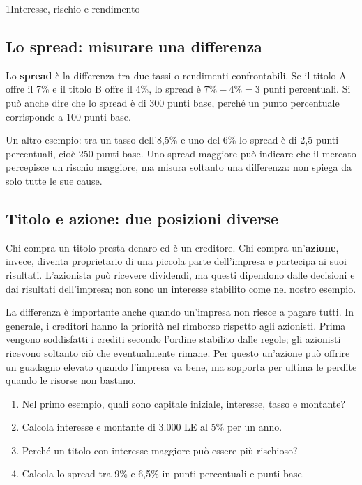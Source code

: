 \begin{lettura}{1}{Interesse, rischio e rendimento}
\subsection*{Lo spread: misurare una differenza}
Lo \textbf{spread} è la differenza tra due tassi o rendimenti confrontabili. Se il titolo A offre il 7\% e il titolo B offre il 4\%, lo spread è $7\%-4\%=3$ punti percentuali. Si può anche dire che lo spread è di 300 punti base, perché un punto percentuale corrisponde a 100 punti base.

Un altro esempio: tra un tasso dell'8,5\% e uno del 6\% lo spread è di 2,5 punti percentuali, cioè 250 punti base. Uno spread maggiore può indicare che il mercato percepisce un rischio maggiore, ma misura soltanto una differenza: non spiega da solo tutte le sue cause.

\subsection*{Titolo e azione: due posizioni diverse}
Chi compra un titolo presta denaro ed è un creditore. Chi compra un'\textbf{azione}, invece, diventa proprietario di una piccola parte dell'impresa e partecipa ai suoi risultati. L'azionista può ricevere dividendi, ma questi dipendono dalle decisioni e dai risultati dell'impresa; non sono un interesse stabilito come nel nostro esempio.

La differenza è importante anche quando un'impresa non riesce a pagare tutti. In generale, i creditori hanno la priorità nel rimborso rispetto agli azionisti. Prima vengono soddisfatti i crediti secondo l'ordine stabilito dalle regole; gli azionisti ricevono soltanto ciò che eventualmente rimane. Per questo un'azione può offrire un guadagno elevato quando l'impresa va bene, ma sopporta per ultima le perdite quando le risorse non bastano.





\attivita
\begin{enumerate}

\item Nel primo esempio, quali sono capitale iniziale, interesse, tasso e montante?

\item Calcola interesse e montante di 3.000 LE al 5\% per un anno.

\item Perché un titolo con interesse maggiore può essere più rischioso?

\item Calcola lo spread tra 9\% e 6,5\% in punti percentuali e punti base.


\end{enumerate}
\end{lettura}
